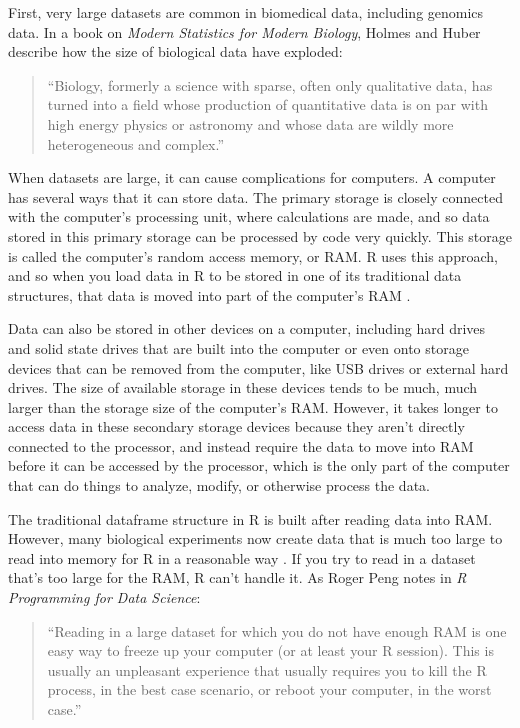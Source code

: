 \documentclass[]{tufte-book}
\begin{document}
First, very large datasets are common in biomedical data, including genomics
data. In a book on \emph{Modern Statistics for Modern Biology}, Holmes and Huber
describe how the size of biological data have exploded:

\begin{quote}
``Biology, formerly a science with sparse, often only qualitative data, has
turned into a field whose production of quantitative data is on par with high
energy physics or astronomy and whose data are wildly more heterogeneous and
complex.'' \citep{holmes2018modern}
\end{quote}

When datasets are large, it can cause complications for computers. A computer
has several ways that it can store data. The primary storage is closely
connected with the computer's processing unit, where calculations are made, and
so data stored in this primary storage can be processed by code very quickly.
This storage is called the computer's random access memory, or RAM. R uses this
approach, and so when you load data in R to be stored in one of its traditional
data structures, that data is moved into part of the computer's RAM
\citep{burns2011r, gillespie2016efficient}.

Data can also be stored in other devices on a computer, including hard drives
and solid state drives that are built into the computer or even onto storage
devices that can be removed from the computer, like USB drives or external hard
drives. The size of available storage in these devices tends to be much, much
larger than the storage size of the computer's RAM. However, it takes longer to
access data in these secondary storage devices because they aren't directly
connected to the processor, and instead require the data to move into RAM before
it can be accessed by the processor, which is the only part of the computer that
can do things to analyze, modify, or otherwise process the data.

The traditional dataframe structure in R is built after
reading data into RAM. However, many biological experiments now create
data that is much too large to read into memory for R in a reasonable way
\citep{lawrence2014scalable, hicks2021mbkmeans}. If you try to read in a dataset
that's too large for the RAM, R can't handle it. As Roger Peng notes in
\emph{R Programming for Data Science}:

\begin{quote}
``Reading in a large dataset for which you do not have enough RAM is one easy
way to freeze up your computer (or at least your R session). This is usually an
unpleasant experience that usually requires you to kill the R process, in the
best case scenario, or reboot your computer, in the worst case.'' \citep{peng2016r}
\end{quote}
\end{document}
